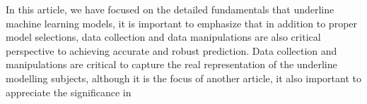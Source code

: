 
\par
In this article, we have focused on the detailed fundamentals that underline machine learning models, it is important to emphasize that in addition to proper model selections, data collection and data manipulations are also critical perspective to achieving accurate and robust prediction. Data collection and manipulations are critical to capture the real representation of the underline modelling subjects, although it is the focus of another article, it also important to appreciate the significance in 
\par 

